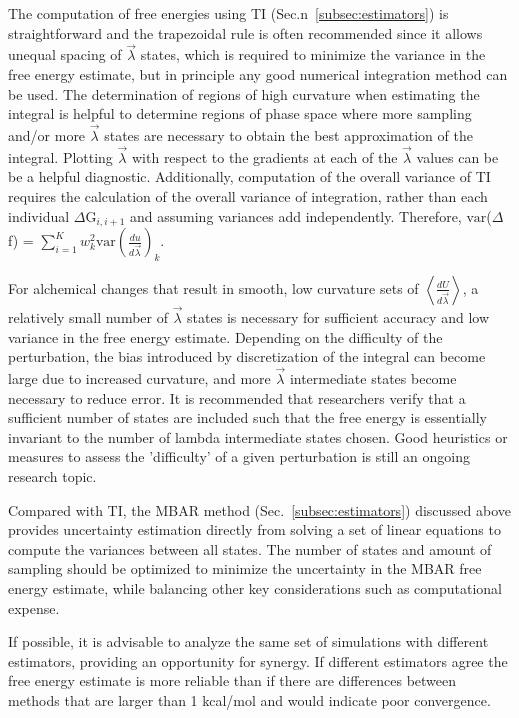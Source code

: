 \documentclass[9pt,bestpractices]{livecoms}
\newcommand{\expect}[1]{\left\langle{#1}\right\rangle}
\begin{document}
The computation of free energies using TI (Sec.n~\ref{subsec:estimators}) is straightforward and the trapezoidal rule is often recommended since it allows unequal spacing of $\vec{\lambda}$ states, which is required to minimize the variance in the free energy estimate, but in principle any good numerical integration method can be used. 
The determination of regions of high curvature when estimating the integral is helpful to determine regions of phase space where more sampling and/or more $\vec{\lambda}$ states are necessary to obtain the best approximation of the integral. Plotting $\vec{\lambda}$ with respect to the gradients at each of the $\vec{\lambda}$ values can be be a helpful diagnostic. 
Additionally, computation of the overall variance of TI requires the calculation of the overall variance of integration, rather than each individual $\Delta$G$_{i,i+1}$ and assuming variances add independently. 
Therefore, $\mathrm{var}$($\Delta$f) = $\sum_{i=1}^{K}w_{k}^2 \mathrm{var}(\frac{du}{d\vec{\lambda}})_{k}$.

For alchemical changes that result in smooth, low curvature sets of $\expect{\frac{dU}{d\vec{\lambda}}}$, a relatively small number of $\vec{\lambda}$ states is necessary for sufficient accuracy and low variance in the free energy estimate. 
Depending on the difficulty of the perturbation, the bias introduced by discretization of the integral can become large due to increased curvature, and more $\vec{\lambda}$ intermediate states become necessary to reduce error.
It is recommended that researchers verify that a sufficient number of states are included such that the free energy is essentially invariant to the number of lambda intermediate states chosen. Good heuristics or measures to assess the 'difficulty' of a given perturbation is still an ongoing research topic. 

Compared with TI, the MBAR method (Sec.~\ref{subsec:estimators}) discussed above provides uncertainty estimation directly from solving a set of linear equations to compute the variances between all states. 
The number of states and amount of sampling should be optimized to minimize the uncertainty in the MBAR free energy estimate, while balancing other key considerations such as computational expense. 

If possible, it is advisable to analyze the same set of simulations with different estimators, providing an opportunity for synergy. If different estimators agree the free energy estimate is more reliable than if there are differences between methods that are larger than 1 kcal/mol and would indicate poor convergence. 
\end{document}
